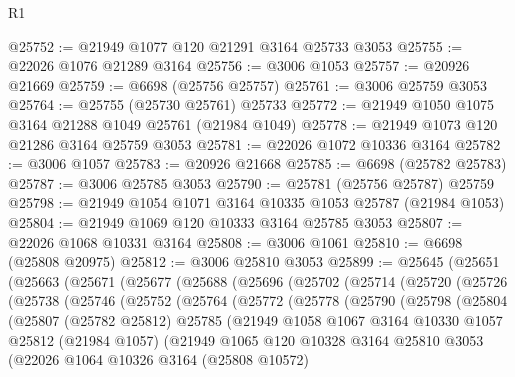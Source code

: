\begin{lexlean}{R1}
\begin{coremodule}
@25752 := @21949 @1077 @120 @21291 @3164 @25733 @3053
@25755 := @22026 @1076 @21289 @3164
@25756 := @3006 @1053
@25757 := @20926 @21669
@25759 := @6698 (@25756 @25757)
@25761 := @3006 @25759 @3053
@25764 := @25755 (@25730 @25761) @25733
@25772 := @21949 @1050 @1075 @3164 @21288 @1049 @25761 (@21984 @1049)
@25778 := @21949 @1073 @120 @21286 @3164 @25759 @3053
@25781 := @22026 @1072 @10336 @3164
@25782 := @3006 @1057
@25783 := @20926 @21668
@25785 := @6698 (@25782 @25783)
@25787 := @3006 @25785 @3053
@25790 := @25781 (@25756 @25787) @25759
@25798 := @21949 @1054 @1071 @3164 @10335 @1053 @25787 (@21984 @1053)
@25804 := @21949 @1069 @120 @10333 @3164 @25785 @3053
@25807 := @22026 @1068 @10331 @3164
@25808 := @3006 @1061
@25810 := @6698 (@25808 @20975)
@25812 := @3006 @25810 @3053
@25899 := @25645
    (@25651
      (@25663
        (@25671
          (@25677
            (@25688
              (@25696
                (@25702
                  (@25714
                    (@25720
                      (@25726
                        (@25738
                          (@25746
                            (@25752
                              (@25764
                                (@25772
                                  (@25778
                                    (@25790
                                      (@25798
                                        (@25804
                                          (@25807
                                            (@25782 @25812)
                                            @25785
                                            (@21949
                                              @1058
                                              @1067
                                              @3164
                                              @10330
                                              @1057
                                              @25812
                                              (@21984 @1057)
                                              (@21949
                                                @1065
                                                @120
                                                @10328
                                                @3164
                                                @25810
                                                @3053
                                                (@22026
                                                  @1064
                                                  @10326
                                                  @3164
                                                  (@25808 @10572)

\end{coremodule}
\end{lexlean}
